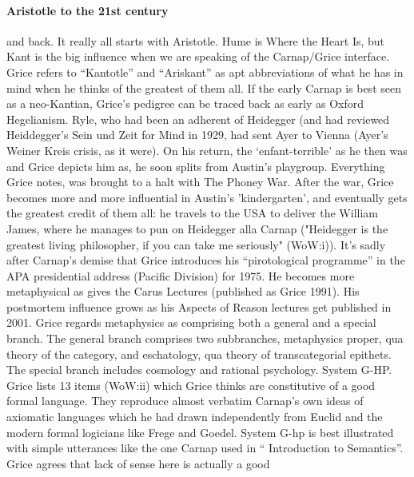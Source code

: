 \documentclass[10pt,titlepage]{book}
\begin{document}
{\paragraph{Aristotle to the 21st century} and back.  It really all starts with 
Aristotle. Hume  is Where the Heart Is, but Kant is the big influence when we 
are speaking of the  Carnap/Grice interface. Grice refers to “Kantotle” and 
“Ariskant” as apt  abbreviations of what he has in mind when he thinks of 
the greatest of them all.  If the early Carnap is best seen as a 
neo-Kantian, Grice’s pedigree can be  traced back as early as Oxford Hegelianism. Ryle, 
who had been an adherent of  Heidegger (and had reviewed Heiddegger’s Sein 
und Zeit for Mind in 1929, had  sent Ayer to Vienna (Ayer’s Weiner Kreis 
crisis, as it were). On his return, the  ‘enfant-terrible’ as he then was and 
Grice depicts him as, he soon splits from  Austin's playgroup.
Everything 
Grice notes, was brought to a halt with The  Phoney War. After the war, Grice 
becomes more and more influential in Austin's  'kindergarten', and 
eventually gets the greatest credit of them all: he travels  to the USA to deliver 
the William James, where he manages to pun on Heidegger  alla 
Carnap  ("Heidegger is the greatest living philosopher, if you can take me 
seriously"  (WoW:i)). It’s sadly after Carnap’s demise that Grice 
introduces his  “pirotological programme” in the APA presidential address (Pacific 
Division) for  1975. He becomes more metaphysical as gives the Carus Lectures 
(published as  Grice 1991). His postmortem influence grows as his Aspects 
of Reason lectures  get published  in  2001. 
Grice  regards metaphysics as comprising both a general and a special 
branch. The  general branch comprises two subbranches, metaphysics proper, qua 
theory of the  category, and eschatology, qua theory of transcategorial 
epithets. The special  branch includes cosmology and rational psychology.  
System  G-HP. Grice lists 13 items (WoW:ii) which Grice thinks are 
constitutive of a  good formal language. They reproduce almost verbatim Carnap’s own 
ideas of  axiomatic languages which he had drawn independently from Euclid 
and the modern  formal logicians like Frege and Goedel. System G-hp is best 
illustrated with  simple utterances like the one Carnap used in “
Introduction to Semantics”. Grice  agrees that lack of sense here is actually a good 
}
\end{document}
